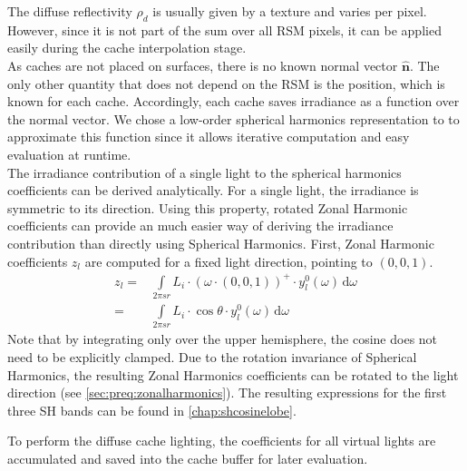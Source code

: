 \documentclass[thesis.tex]{subfiles}
\begin{document}
The diffuse reflectivity $\rho_d$ is usually given by a texture and varies per pixel.
However, since it is not part of the sum over all RSM pixels, it can be applied easily during the cache interpolation stage.\\
As caches are not placed on surfaces, there is no known normal vector $\hat{\mathbf{n}}$.
The only other quantity that does not depend on the RSM is the position, which is known for each cache.
Accordingly, each cache saves irradiance as a function over the normal vector.
We chose a low-order spherical harmonics representation to to approximate this function since it allows iterative computation and easy evaluation at runtime.\\ 
The irradiance contribution of a single light to the spherical harmonics coefficients can be derived analytically. 
For a single light, the irradiance is symmetric to its direction.
Using this property, rotated Zonal Harmonic coefficients can provide an much easier way of deriving the irradiance contribution than directly using Spherical Harmonics.
First, Zonal Harmonic coefficients $z_l$ are computed for a fixed light direction, pointing to $(0,0,1)$.
\begin{align}
z_l =&\int\limits_{2 \pi sr} L_i \cdot (\omega \cdot (0,0,1))^+ \cdot y^0_l(\omega) \,\mathrm{d}\omega\\
=&\int\limits_{2 \pi sr} L_i \cdot \cos\theta \cdot y^0_l(\omega) \,\mathrm{d}\omega
\end{align}
Note that by integrating only over the upper hemisphere, the cosine does not need to be explicitly clamped.
Due to the rotation invariance of Spherical Harmonics, the resulting Zonal Harmonics coefficients can be rotated to the light direction (see \autoref{sec:preq:zonalharmonics}).
The resulting expressions for the first three SH bands can be found in \autoref{chap:shcosinelobe}.

To perform the diffuse cache lighting, the coefficients for all virtual lights are accumulated and saved into the cache buffer for later evaluation. 
\end{document}
